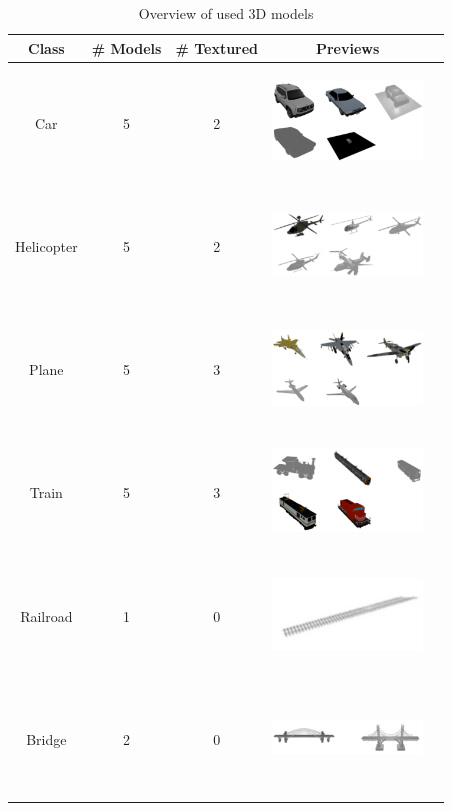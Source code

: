 \documentclass[a4paper,11pt,oneside]{article}
\begin{document}
  
\begin{table}[H]
\label{fig:3Dobjects}
\caption{Overview of used 3D models}
\centering
\begin{tabular}{|c|c|c|c|c}
\hline
\textbf{Class} & \textbf{\# Models} & \textbf{\# Textured} &  \textbf{Previews}\\
\hline
Car & 5 & 2 & \includegraphics[width=4cm, height=3cm, keepaspectratio]{figures/cars.png}\\
\hline
Helicopter & 5 & 2 & \includegraphics[width=4cm, height=3cm, keepaspectratio]{figures/helicopters.png}\\
\hline
Plane & 5 & 3 & \includegraphics[width=4cm, height=3cm, keepaspectratio]{figures/planes.png}\\
\hline
Train & 5 & 3 & \includegraphics[width=4cm, height=3cm, keepaspectratio]{figures/trains.png}\\
\hline
Railroad & 1 & 0 & \includegraphics[width=4cm, height=3cm, keepaspectratio]{figures/rails.png}\\
\hline
Bridge & 2 & 0 & \includegraphics[width=4cm, height=3cm, keepaspectratio]{figures/bridges.png}\\
\hline
\end{tabular}

\end{table}
\end{document}
